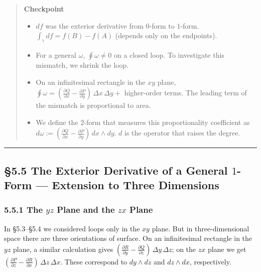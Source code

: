 \begin{quote}
\textbf{Checkpoint}

\begin{itemize}
\item
  \(df\) was the exterior derivative from \(0\)-form to \(1\)-form.
  \(\int_\gamma df = f(B)-f(A)\) (depends only on the endpoints).
\item
  For a general \(\omega\), \(\oint \omega \neq 0\) on a closed loop. To
  investigate this mismatch, we shrink the loop.
\item
  On an infinitesimal rectangle in the \(xy\) plane,
  \(\oint \omega = (\frac{\partial Q}{\partial x} - \frac{\partial P}{\partial y})\,\Delta x\,\Delta y +\)
  higher-order terms. The leading term of the mismatch is proportional
  to area.
\item
  We define the \(2\)-form that measures this proportionality
  coefficient as
  \(d\omega := (\frac{\partial Q}{\partial x} - \frac{\partial P}{\partial y})\,dx \wedge dy\).
  \(d\) is the operator that raises the degree.
\end{itemize}
\end{quote}

\begin{center}\rule{0.5\linewidth}{0.5pt}\end{center}

\hypertarget{the-exterior-derivative-of-a-general-1-form-extension-to-three-dimensions}{%
\subsection{\texorpdfstring{§5.5 The Exterior Derivative of a General
\(1\)-Form --- Extension to Three
Dimensions}{§5.5 The Exterior Derivative of a General 1-Form --- Extension to Three Dimensions}}\label{the-exterior-derivative-of-a-general-1-form-extension-to-three-dimensions}}

\hypertarget{the-yz-plane-and-the-zx-plane}{%
\subsubsection{\texorpdfstring{5.5.1 The \(yz\) Plane and the \(zx\)
Plane}{5.5.1 The yz Plane and the zx Plane}}\label{the-yz-plane-and-the-zx-plane}}

In §5.3--§5.4 we considered loops only in the \(xy\) plane. But in
three-dimensional space there are three orientations of surface. On an
infinitesimal rectangle in the \(yz\) plane, a similar calculation gives
\((\frac{\partial R}{\partial y} - \frac{\partial Q}{\partial z})\,\Delta y\,\Delta z\);
on the \(zx\) plane we get
\((\frac{\partial P}{\partial z} - \frac{\partial R}{\partial x})\,\Delta z\,\Delta x\).
These correspond to \(dy \wedge dz\) and \(dz \wedge dx\), respectively.


